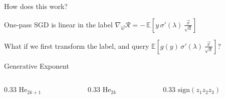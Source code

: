 \documentclass[aspectratio=169,11pt]{beamer}
\begin{document}
\begin{frame}{How does this work?}
  \begin{center}
    {\large One-pass SGD is linear in the label}\quad
    $\displaystyle \nabla_{\vec{w}}\mathcal{R}
      = -\,\mathbb{E}\left[y\,\sigma'(\lambda)\,\frac{\vec{x}}{\sqrt{d}}\right]$
  \end{center}
  \vspace{0.2em}
  \begin{center}
    \large What if we first transform the label, and query
    $\mathbb{E}\left[g(y)\,\sigma'(\lambda)\,\frac{\vec{x}}{\sqrt{d}}\right]$?
  \end{center}
  \vspace{0.3em}
  \pause
  \begin{defbox}[top=2pt, bottom=0pt]{Generative Exponent
      }
  \end{defbox}
  \vspace{0.4em}
  \begin{columns}[T]
    \begin{column}{0.33\textwidth}
      \centering
      $\mathrm{He}_{2k+1}$\par
    \end{column}
    \begin{column}{0.33\textwidth}
      \centering
      $\mathrm{He}_{2k}$\par
    \end{column}
    \begin{column}{0.33\textwidth}
      \centering
      $\mathrm{sign}(z_1 z_2 z_3)$\par
    \end{column}
  \end{columns}
  \vspace{0.4em}

\end{frame}
\end{document}
